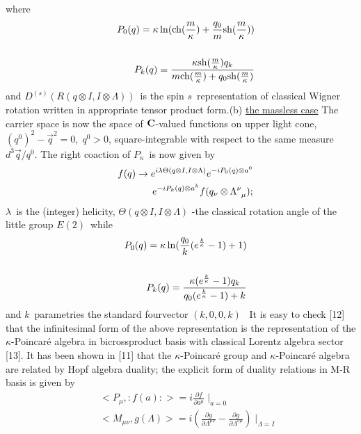 \documentclass[a4paper,a4paper]{article}
\begin{document}
where
\begin{eqnarray}\label{wz5}
&&P_{0}(q)=\kappa
\ln({\rm ch}(\frac{m}{\kappa})+\frac{q_{0}}{m}{\rm sh}(\frac{m}{\kappa}))
\label{w2} \\
\nonumber \\
&&P_{k}(q)=\frac{\kappa
{\rm sh}(\frac{m}{\kappa})q_{k}}{m {\rm ch}(\frac{m}{\kappa})%
+q_{0}{\rm sh}(\frac{m}{\kappa})}  \label{w3}
\end{eqnarray}
and $D^{(s)}(R(q\otimes I,I\otimes \Lambda))$\ is the spin $s$\
representation of classical Wigner rotation written in
appropriate tensor product form.\newline (b) \underline{the
massless case} \newline The carrier space is now the space of
$\bf{C}$-valued functions on upper light cone,
$(q^{0})^{2}-\vec{q}^{2} =0, \;q^{0}>0$, square-integrable with
respect to the same measure $d^{3}\vec{q}/q^{0}$. The right
coaction of $P_{\kappa} $\ is now given by
\begin{eqnarray}\label{wz6}
&& f(q)\rightarrow
 e^{i\lambda \Theta (q\otimes I,I\otimes
\Lambda)}e^{-iP_{0}(q)\otimes a^{0}}
\cr
&&
\quad
e^{-iP_{k}(q)\otimes a^{k}}
f(q_{\nu}
\otimes\Lambda_{\;\;\mu}^{\nu});  \label{w4}
\end{eqnarray}
$\lambda$\ is the (integer) helicity, $\Theta (q\otimes I,I\otimes
\Lambda)$%
-the classical rotation angle of the little group $E(2)$\ while
\begin{eqnarray}\label{wz7}
&&P_{0}(q)=\kappa \ln (\frac{q_{0}}{k}(e^{\frac{k}{\kappa}}-1)+1)
\label{w5}
\\
\nonumber \\
&&P_{k}(q)= \frac{\kappa(e^{\frac{k}{\kappa}}-
1)q_{k}}{q_{0}(e^{\frac{k}{%
\kappa}}-1)+k}  \label{w6}
\end{eqnarray}
and $k$\ parametries the standard fourvector $(k,0,0,k)$\ \newline
It is easy to check [12] that the infinitesimal form of the above
representation is the representation of the $\kappa$-Poincar\'{e}
algebra in bicrossproduct  basis with classical Lorentz algebra
sector [13]. It has been shown in [11] that the $\kappa$-Poincar\'{e}
group and $\kappa$-Poincar\'{e} algebra are related by Hopf algebra
duality; the explicit form of duality relations in M-R basis is
given by
\begin{eqnarray}\label{wz8}
&&<P_{\mu},:f(a):>=i \frac{\partial f}
{\partial a^{\mu}}\mid_{a=0} \nonumber \\
&&<M_{\mu \nu},g(\Lambda )>=
i(\frac{\partial g}{\partial \Lambda^{\mu \nu}}-\frac{\partial g}
{\partial \Lambda^{\nu \mu}})\mid_{\Lambda = I} \label{w77}
\end{eqnarray}
\end{document}
